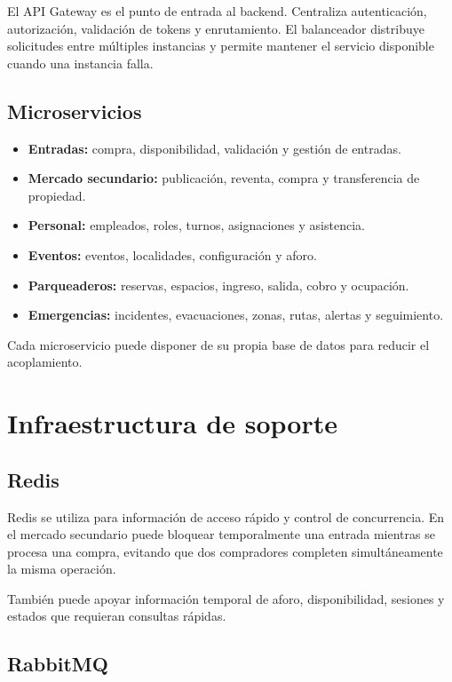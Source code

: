 \documentclass[12pt,a4paper]{article}
\begin{document}
El API Gateway es el punto de entrada al backend. Centraliza autenticación, autorización, validación de tokens y enrutamiento. El balanceador distribuye solicitudes entre múltiples instancias y permite mantener el servicio disponible cuando una instancia falla.

\subsection{Microservicios}

\begin{itemize}
\item \textbf{Entradas:} compra, disponibilidad, validación y gestión de entradas.
\item \textbf{Mercado secundario:} publicación, reventa, compra y transferencia de propiedad.
\item \textbf{Personal:} empleados, roles, turnos, asignaciones y asistencia.
\item \textbf{Eventos:} eventos, localidades, configuración y aforo.
\item \textbf{Parqueaderos:} reservas, espacios, ingreso, salida, cobro y ocupación.
\item \textbf{Emergencias:} incidentes, evacuaciones, zonas, rutas, alertas y seguimiento.
\end{itemize}

Cada microservicio puede disponer de su propia base de datos para reducir el acoplamiento.

\section{Infraestructura de soporte}

\subsection{Redis}

Redis se utiliza para información de acceso rápido y control de concurrencia. En el mercado secundario puede bloquear temporalmente una entrada mientras se procesa una compra, evitando que dos compradores completen simultáneamente la misma operación.

También puede apoyar información temporal de aforo, disponibilidad, sesiones y estados que requieran consultas rápidas.

\subsection{RabbitMQ}
\end{document}
